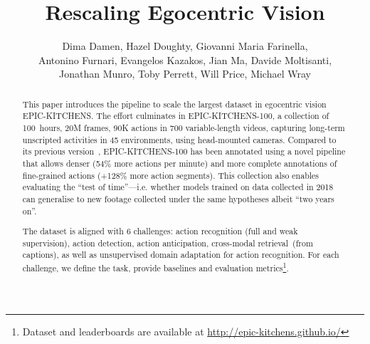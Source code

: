 \RequirePackage{amsmath} \documentclass[runningheads]{llncs}
\makeatletter
\newcommand*{\ie}{i.e.\@\xspace}
\makeatother
\begin{document}
\pagestyle{headings}
\mainmatter

\title{Rescaling Egocentric Vision} \begin{comment}
\titlerunning{ECCV-20 submission ID \ECCVSubNumber}
\authorrunning{ECCV-20 submission ID \ECCVSubNumber}
\author{Anonymous ECCV submission}
\institute{Paper ID \ECCVSubNumber}
\end{comment}


\author{Dima Damen, Hazel Doughty,
Giovanni Maria Farinella,\\
Antonino Furnari,
Evangelos Kazakos,
Jian Ma,
Davide Moltisanti,\\
Jonathan Munro,
Toby Perrett,
Will Price,
Michael Wray}


\maketitle
\vspace{-2mm}
\begin{abstract}
This paper introduces the pipeline to scale the largest dataset in egocentric vision EPIC-KITCHENS. The effort culminates in EPIC-KITCHENS-100, a collection of 100~hours, 20M frames, 90K actions in 700 variable-length videos, capturing long-term unscripted activities in 45 environments, using head-mounted cameras. 
Compared to its previous version~\cite{Damen2018EPICKITCHENS}, EPIC-KITCHENS-100 has been annotated using a novel pipeline that allows denser (54\% more actions per minute) and more complete annotations of fine-grained actions (+128\% more action segments).
This collection also enables evaluating the ``test of time''---\ie whether models trained on data collected in 2018 can generalise to new footage collected under the same hypotheses albeit ``two years on''.

The dataset is aligned with 6 challenges: action recognition (full and weak supervision), action detection,  action anticipation, cross-modal retrieval~(from captions), as well as unsupervised domain adaptation for action recognition. For each challenge, we define the task, provide baselines and evaluation metrics\footnote{Dataset and leaderboards are available at \url{http://epic-kitchens.github.io/}}. 


\end{abstract}
\end{document}
